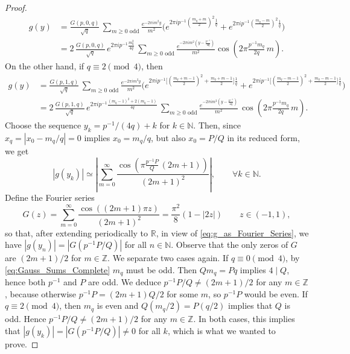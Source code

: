 \documentclass[11pt,reqno]{amsart}
\theoremstyle{definition}
\begin{document}
\begin{proof}
\begin{equation}
\begin{split}
g(y) & = \frac{G(p,0,q)}{\sqrt{q}} \,  \sum_{m \geq 0 \text{ odd}} \frac{e^{- 2\pi i m^2 y}}{ m^2} \Big(  e^{2\pi i p^{-1} \left( \frac{m_q + m}{2}  \right)^2 \frac{1}{q} } + e^{2\pi i p^{-1} \left( \frac{m_q - m}{2}  \right)^2 \frac{1}{q} }   \Big) \\
& =  2 \, \frac{G(p,0,q)}{\sqrt{q}} \, e^{2\pi i p^{-1} \frac{m_q^2}{4q}  } \, 
\sum_{m \geq 0 \text{ odd}} \frac{e^{- 2\pi i m^2 (y - \frac{ p^{-1} }{4q} ) }}{ m^2} \cos\left(  2\pi  \frac{p^{-1}  m_q }{2q} \, m \right).
\end{split}
\end{equation}
On the other hand, if $q \equiv 2 \pmod{4}$, then 
\begin{equation}
\begin{split}
g(y) & = \frac{G(p,1,q)}{\sqrt{q}} \,  \sum_{m \geq 0 \text{ odd}} \frac{e^{- 2\pi i m^2 y}}{ m^2}  \Big( e^{2\pi i p^{-1} \Big[ \left( \frac{m_q + m - 1}{2}  \right)^2 + \frac{m_q + m - 1}{2} \Big] \frac{1}{q} } + e^{2\pi i p^{-1} \Big[ \left( \frac{m_q - m - 1}{2}  \right)^2 + \frac{m_q - m - 1}{2} \Big] \frac{1}{q} }   \Big) \\
& =  2 \, \frac{G(p,1,q)}{\sqrt{q}} \, e^{2\pi i p^{-1} \frac{(m_q - 1)^2 + 2(m_q - 1)}{4q}  } \, 
\sum_{m \geq 0 \text{ odd}} \frac{e^{- 2\pi i m^2 (y - \frac{ p^{-1} }{4q} ) }}{ m^2} \, \cos\left(  2\pi   \frac{ p^{-1} m_q   }{2q} \, m \right).
\end{split}
\end{equation}
Choose the sequence $y_k = p^{-1}/(4q) + k $ for $k \in \mathbb N$. 
Then, since $x_q = |x_0 - m_q/q| = 0$ implies $x_0 = m_q/q$, 
but also $x_0 = P/Q$ in its reduced form, we get
\begin{equation}\label{eq:g_as_Fourier_Series}
|g(y_k)|  \simeq  
\left| \sum_{m = 0}^\infty \frac{\cos\left(  \pi  \frac{p^{-1}  P }{Q} \, (2m+1) \right)}{ (2m+1)^2} \right|, \qquad \forall k \in \mathbb N. 
\end{equation}
Define the Fourier series 
\begin{equation}
G(z)  =  
\sum_{m = 0}^\infty \frac{\cos\left(  (2m+1) \pi  z \right)}{ (2m+1)^2} = \frac{ \pi^2}{8} (1 - |2z|) \qquad z \in (-1,1),
\end{equation}
so that, after extending periodically to $\mathbb R$, in view of \eqref{eq:g_as_Fourier_Series}, we have  
$|g(y_n)| = |G(p^{-1}P/Q)|$ for all $n \in \mathbb N$. 
Observe that the only zeros of $G$ are $(2m+1)/2$ for $m \in \mathbb Z$.
We separate two cases again. If $q \equiv 0 \pmod{4}$, by \eqref{eq:Gauss_Sums_Complete} $m_q$ must be odd. 
Then $Qm_q = Pq$ implies $4 \mid Q$, hence both $p^{-1}$ and $P$ are odd.
We deduce $p^{-1}P/Q \neq (2m+1)/2$ for any $m \in \mathbb Z$, because otherwise $p^{-1}P = (2m+1) Q/2$ for some $m$, so $p^{-1}P$ would be even. 
If $q \equiv 2 \pmod{4}$, then $m_q$ is even and $Q(m_q/2) = P(q/2)$ implies that $Q$ is odd. Hence $p^{-1}P/Q \neq (2m+1)/2$ for any $m\in\mathbb Z$.  
In both cases, this implies that $|g(y_k)| = |G(p^{-1}P/Q)| \neq 0$
for all $k$, which is what we wanted to prove. 


\end{proof}
\end{document}
